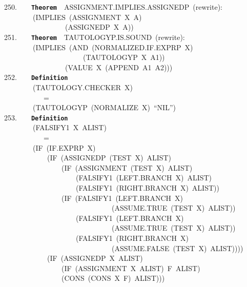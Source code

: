 \documentclass[11pt]{book}
\newenvironment{pubasis}{\begin{flushleft}\ttfamily\small}{\normalsize\rmfamily\end{flushleft}}
\newcommand{\axiomordefinition}[1]{\vspace{6pt}\texttt{\textbf{#1}}}
\begin{document}
\begin{pubasis}
250.~~~~\axiomordefinition{Theorem}~~ASSIGN\-MENT.IMPLIES.ASSIGNEDP~(rewrite):\\
~~~~~~~~(IMPLIES~(ASSIGNMENT~X~A)\\
~~~~~~~~~~~~~~~~~(ASSIGNEDP~X~A))\\

251.~~~~\axiomordefinition{Theorem}~~TAU\-TOL\-OGYP.IS.SOUND~(rewrite):\\
~~~~~~~~(IMPLIES~(AND~(NOR\-MAL\-IZED.IF.EXPRP~X)\\
~~~~~~~~~~~~~~~~~~~~~~(TAUTOLOGYP~X~A1))\\
~~~~~~~~~~~~~~~~~(VALUE~X~(APPEND~A1~A2)))\\

252.~~~~\axiomordefinition{Definition}\\
~~~~~~~~(TAU\-TOL\-OGY.CHECK\-ER~X)\\
~~~~~~~~~~~=\\
~~~~~~~~(TAUTOLOGYP~(NORMALIZE~X)~``NIL'')\\

253.~~~~\axiomordefinition{Definition}\\
~~~~~~~~(FALSIFY1~X~ALIST)\\
~~~~~~~~~~~=\\
~~~~~~~~(IF~(IF.EXPRP~X)\\
~~~~~~~~~~~~(IF~(ASSIGNEDP~(TEST~X)~ALIST)\\
~~~~~~~~~~~~~~~~(IF~(ASSIGNMENT~(TEST~X)~ALIST)\\
~~~~~~~~~~~~~~~~~~~~(FAL\-SI\-FY1~(LEFT.BRANCH~X)~ALIST)\\
~~~~~~~~~~~~~~~~~~~~(FAL\-SI\-FY1~(RIGHT.BRANCH~X)~ALIST))\\
~~~~~~~~~~~~~~~~(IF~(FAL\-SI\-FY1~(LEFT.BRANCH~X)\\
~~~~~~~~~~~~~~~~~~~~~~~~~~~~~~(AS\-SUME.TRUE~(TEST~X)~ALIST))\\
~~~~~~~~~~~~~~~~~~~~(FAL\-SI\-FY1~(LEFT.BRANCH~X)\\
~~~~~~~~~~~~~~~~~~~~~~~~~~~~~~(AS\-SUME.TRUE~(TEST~X)~ALIST))\\
~~~~~~~~~~~~~~~~~~~~(FAL\-SI\-FY1~(RIGHT.BRANCH~X)\\
~~~~~~~~~~~~~~~~~~~~~~~~~~~~~~(AS\-SUME.FALSE~(TEST~X)~ALIST))))\\
~~~~~~~~~~~~(IF~(ASSIGNEDP~X~ALIST)\\
~~~~~~~~~~~~~~~~(IF~(ASSIGNMENT~X~ALIST)~F~ALIST)\\
~~~~~~~~~~~~~~~~(CONS~(CONS~X~F)~ALIST)))\\


\end{pubasis}
\end{document}
